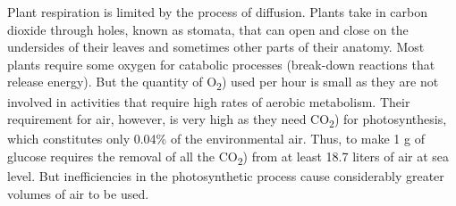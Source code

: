 Plant respiration is limited by the process of diffusion. Plants take in carbon dioxide through holes, known as stomata, that can open and close on the undersides of their leaves and sometimes other parts of their anatomy. Most plants require some oxygen for catabolic processes (break-down reactions that release energy). But the quantity of O\textsubscript{2}) used per hour is small as they are not involved in activities that require high rates of aerobic metabolism. Their requirement for air, however, is very high as they need CO\textsubscript{2}) for photosynthesis, which constitutes only 0.04\% of the environmental air. Thus, to make 1 g of glucose requires the removal of all the CO\textsubscript{2}) from at least 18.7 liters of air at sea level. But inefficiencies in the photosynthetic process cause considerably greater volumes of air to be used.


